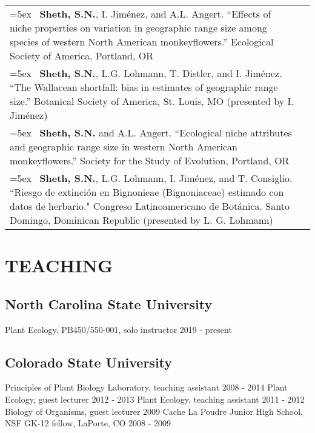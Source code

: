 \documentclass[11pt,english]{article}\usepackage[]{graphicx}\usepackage[]{xcolor}
\providecommand{\tabularnewline}{\\}
\begin{document}
\renewcommand{\arraystretch}{1.2} 
\begin{tabularx}{\textwidth}{@{}>{\raggedright}p{5.25in} >{\raggedleft}X@{}}

\hangindent=5ex \ \textbf{Sheth, S.N.}, I. Jim\'enez, and A.L. Angert. ``Effects of niche properties on variation in geographic range size among species of western North American monkeyflowers.'' Ecological Society of America, Portland, OR & 2012 \tabularnewline

\hangindent=5ex \ \textbf{Sheth, S.N.}, L.G. Lohmann, T. Distler, and I. Jim\'enez. ``The Wallacean shortfall: bias in estimates of geographic range size.'' Botanical Society of America, St. Louis, MO (presented by I. Jim\'enez) & 2011 \tabularnewline

\hangindent=5ex \ \textbf{Sheth, S.N.} and A.L. Angert. ``Ecological niche attributes and geographic range size in western North American monkeyflowers.'' Society for the Study of Evolution, Portland, OR & 2010 \tabularnewline

\hangindent=5ex \ \textbf{Sheth, S.N.}, L.G. Lohmann, I. Jim\'enez, and T. Consiglio. ``Riesgo de extinci\'on en Bignonieae (Bignoniaceae) estimado con datos de herbario." Congreso Latinoamericano de Bot\'anica. Santo Domingo, Dominican Republic (presented by L. G. Lohmann) & 2006 \tabularnewline 

\end{tabularx}

\section*{TEACHING}

\subsection*{North Carolina State University}
Plant Ecology, PB450/550-001, solo instructor \hfill {2019 - present} 

\subsection*{Colorado State University}
Principles of Plant Biology Laboratory, teaching assistant \hfill {2008 - 2014} \newline
Plant Ecology, guest lecturer \hfill {2012 - 2013} \newline
Plant Ecology, teaching assistant \hfill {2011 - 2012} \newline
Biology of Organisms, guest lecturer \hfill {2009} \newline
Cache La Poudre Junior High School, NSF GK-12 fellow, LaPorte, CO \hfill {2008 - 2009}
\end{document}
